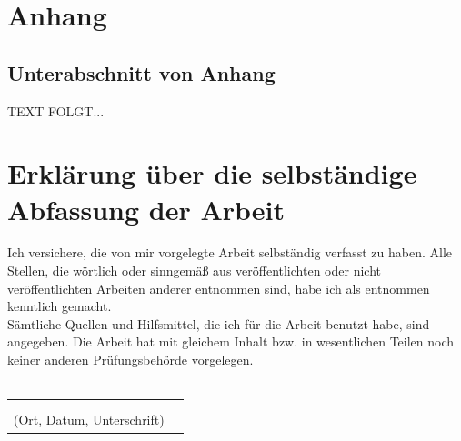 \documentclass[a4paper,12pt,oneside]{article}
\begin{document}

  \newpage
  \setcounter{section}{0} %
  \renewcommand*\thesection{\Alph{section}} %
  \section{Anhang}\label{anhang}
    \subsection{Unterabschnitt von Anhang}\label{subsec_UabsAnhang}
    TEXT FOLGT...
  
  \newpage
  
 \pagestyle{empty}
 \section*{Erklärung über die selbständige\\Abfassung der Arbeit} %
 Ich versichere, die von mir vorgelegte Arbeit selbständig verfasst zu haben.
 Alle Stellen, die wörtlich oder sinngemäß aus veröffentlichten oder nicht veröffentlichten Arbeiten anderer entnommen sind,
 habe ich als entnommen kenntlich gemacht.\\ 
 Sämtliche Quellen und Hilfsmittel, die ich für die Arbeit benutzt habe, sind
 angegeben. Die Arbeit hat mit gleichem Inhalt bzw. in wesentlichen Teilen noch keiner anderen Prüfungsbehörde vorgelegen.\\\\
\begin{tabular}{cp{7cm}}
    & \\ 
    & \\ \hline
  \small (Ort, Datum, Unterschrift) & \normalsize \\
  \end{tabular}
  
\end{document}
